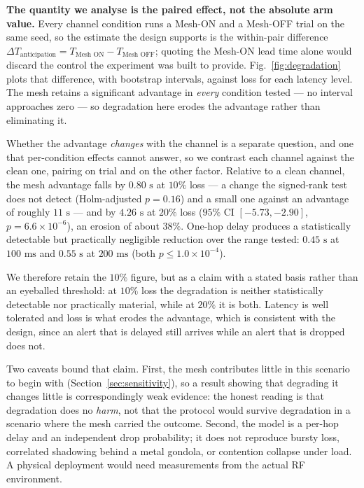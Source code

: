 \documentclass[journal]{IEEEtran}
\begin{document}


\textbf{The quantity we analyse is the paired effect, not the absolute arm value.}
Every channel condition runs a Mesh-ON and a Mesh-OFF trial on the same seed, so
the estimate the design supports is the within-pair difference $\Delta
T_{\text{anticipation}} = T_{\text{Mesh ON}} - T_{\text{Mesh OFF}}$; quoting the
Mesh-ON lead time alone would discard the control the experiment was built to
provide. Fig.~\ref{fig:degradation} plots that difference, with bootstrap intervals,
against loss for each latency level. The mesh retains a significant advantage in
\emph{every} condition tested --- no interval approaches zero --- so degradation
here erodes the advantage rather than eliminating it.

Whether the advantage \emph{changes} with the channel is a separate question, and
one that per-condition effects cannot answer, so we contrast each channel against
the clean one, pairing on trial and on the other factor. Relative to a clean
channel, the mesh advantage falls by $0.80\text{ s}$ at $10\%$ loss --- a change the
signed-rank test does not detect (Holm-adjusted $p = 0.16$) and a small one against
an advantage of roughly $11\text{ s}$ --- and by $4.26\text{ s}$ at $20\%$ loss
($95\%$ CI $[-5.73, -2.90]$, $p = 6.6 \times 10^{-6}$), an erosion of about $38\%$.
One-hop delay produces a statistically detectable but practically negligible
reduction over the range tested: $0.45\text{ s}$ at $100\text{ ms}$ and
$0.55\text{ s}$ at $200\text{ ms}$ (both $p \le 1.0 \times 10^{-4}$).

We therefore retain the $10\%$ figure, but as a claim with a stated basis rather
than an eyeballed threshold: at $10\%$ loss the degradation is neither statistically
detectable nor practically material, while at $20\%$ it is both. Latency is well
tolerated and loss is what erodes the advantage, which is consistent with the
design, since an alert that is delayed still arrives while an alert that is dropped
does not.

Two caveats bound that claim. First, the mesh contributes little in this scenario to
begin with (Section~\ref{sec:sensitivity}), so a result showing that degrading it
changes little is correspondingly weak evidence: the honest reading is that
degradation does no \emph{harm}, not that the protocol would survive degradation in a
scenario where the mesh carried the outcome. Second, the model is a per-hop delay and
an independent drop probability; it does not reproduce bursty loss, correlated
shadowing behind a metal gondola, or contention collapse under load. A physical
deployment would need measurements from the actual RF environment.
\end{document}
